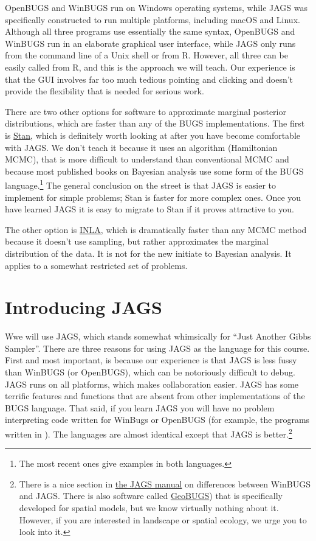 \documentclass[12pt,english]{article}
\begin{document}
OpenBUGS and WinBUGS run on Windows operating systems, while JAGS was specifically constructed to run multiple platforms, including macOS and Linux. Although all three programs use essentially the same syntax, OpenBUGS and WinBUGS run in an elaborate graphical user interface, while JAGS only runs from the command line of a Unix shell or from R. However, all three can be easily called from R, and this is the approach we will teach. Our experience is that the GUI involves far too much tedious pointing and clicking and doesn't provide the flexibility that is needed for serious work. 

There are two other options for software to approximate marginal posterior distributions, which are  faster than any of the BUGS implementations. The first is \href{http://mc-stan.org/}{Stan}, which is definitely worth looking at after you have become comfortable with JAGS. We don't teach it because it uses an algorithm (Hamiltonian MCMC), that is more difficult to understand than conventional MCMC and because most published books on Bayesian analysis use some form of the BUGS language.\footnote{The most recent ones give examples in both languages.} The general conclusion on the street is that JAGS is easier to implement for simple problems; Stan is faster for more complex ones. Once you have learned JAGS it is easy to migrate to Stan if it proves attractive to you. 

The other option is \href{http://www.r-inla.org/}{INLA}, which is dramatically faster than any MCMC method because it doesn't use sampling, but rather approximates the marginal distribution of the data. It is not for the new initiate to Bayesian analysis. It applies to a somewhat restricted set of problems.

\section{Introducing JAGS}

Wwe will use JAGS, which stands somewhat whimsically for \enquote{Just Another Gibbs Sampler}. There are three reasons for using JAGS as the language for this course. First and most important, is because our experience is that JAGS is less fussy than WinBUGS (or OpenBUGS), which can be notoriously difficult to debug.  JAGS runs on all platforms, which makes collaboration easier. JAGS has some terrific features and functions that are absent from other implementations of the BUGS language. That said, if you learn JAGS you will have no problem interpreting code written for WinBugs or OpenBUGS (for example, the programs written in \citealt{McCarthy_Bayes_book}). The languages are almost identical except that JAGS is better.\footnote{There is a nice section in \href{https://sourceforge.net/projects/mcmc-jags/files/Manuals/4.x/}{the JAGS manual} on differences between WinBUGS and JAGS. There is also software called \href{http://www.mrc-bsu.cam.ac.uk/bugs/winbugs/contents.shtml}{GeoBUGS}) that is specifically developed for spatial models, but we know virtually nothing about it. However, if you are interested in landscape or spatial ecology, we urge you to look into it.}
\end{document}
